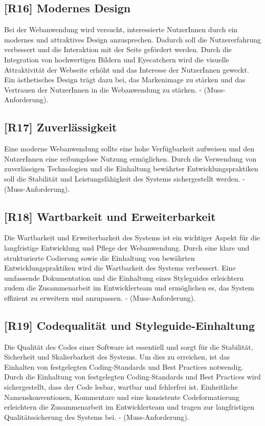 \subsection{[R16] Modernes Design}

Bei der Webanwendung wird versucht, interessierte NutzerInnen durch ein modernes und attraktives Design anzusprechen. Dadurch soll die Nutzererfahrung verbessert und die Interaktion mit der Seite gefördert werden. Durch die Integration von hochwertigen Bildern und Eyecatchern wird die visuelle Attraktivität der Webseite erhöht und das Interesse der NutzerInnen geweckt. Ein ästhetisches Design trägt dazu bei, das Markenimage zu stärken und das Vertrauen der NutzerInnen in die Webanwendung zu stärken. - (Muss-Anforderung).

\subsection{[R17] Zuverlässigkeit}

Eine moderne Webanwendung sollte eine hohe Verfügbarkeit aufweisen und den NutzerInnen eine reibungslose Nutzung ermöglichen. Durch die Verwendung von zuverlässigen Technologien und die Einhaltung bewährter Entwicklungspraktiken soll die Stabilität und Leistungsfähigkeit des Systems sichergestellt werden. - (Muss-Anforderung).

\subsection{[R18] Wartbarkeit und Erweiterbarkeit}

Die Wartbarkeit und Erweiterbarkeit des Systems ist ein wichtiger Aspekt für die langfristige Entwicklung und Pflege der Webanwendung. Durch eine klare und strukturierte Codierung sowie die Einhaltung von bewährten Entwicklungspraktiken wird die Wartbarkeit des Systems verbessert. Eine umfassende Dokumentation und die Einhaltung eines Styleguides erleichtern zudem die Zusammenarbeit im Entwicklerteam und ermöglichen es, das System effizient zu erweitern und anzupassen. - (Muss-Anforderung).

\subsection{[R19] Codequalität und Styleguide-Einhaltung}

Die Qualität des Codes einer Software ist essentiell und sorgt für die Stabilität, Sicherheit und Skalierbarkeit des Systems. Um dies zu erreichen, ist das Einhalten von festgelegten Coding-Standards und Best Practices notwendig. Durch die Einhaltung von festgelegten Coding-Standards und Best Practices wird sichergestellt, dass der Code lesbar, wartbar und fehlerfrei ist. Einheitliche Namenskonventionen, Kommentare und eine konsistente Codeformatierung erleichtern die Zusammenarbeit im Entwicklerteam und tragen zur langfristigen Qualitätssicherung des Systems bei. - (Muss-Anforderung).

